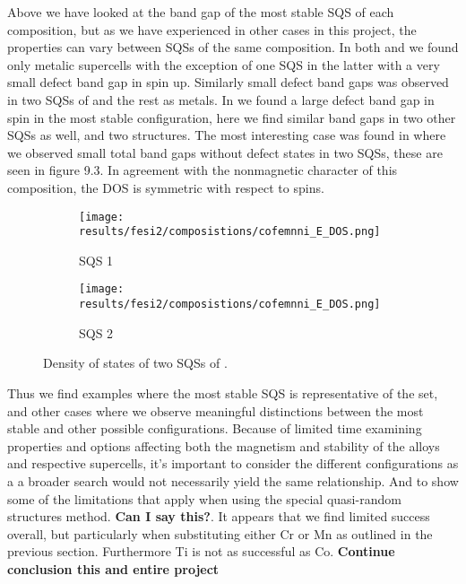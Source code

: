 Above we have looked at the band gap of the most stable SQS of each composition, but as we have experienced in other cases in this project, the properties can vary between SQSs of the same composition. In both  and  we found only metalic supercells with the exception of one SQS in the latter with a very small defect band gap in spin up. Similarly small defect band gaps was observed in two SQSs of  and the rest as metals. In  we found a large defect band gap in spin in the most stable configuration, here we find similar band gaps in two other SQSs as well, and two structures. The most interesting case was found in  where we observed small total band gaps without defect states in two SQSs, these are seen in figure 9.3. In agreement with the nonmagnetic character of this composition, the DOS is symmetric with respect to spins. 

\begin{figure}[H]
\begin{subfigure}{.5\textwidth}
\texttt{[image: results/fesi2/composistions/cofemnni\_E\_DOS.png]}
\caption{SQS 1}
\end{subfigure}
\begin{subfigure}{.5\textwidth}
\texttt{[image: results/fesi2/composistions/cofemnni\_E\_DOS.png]}
\caption{SQS 2}
\end{subfigure}
\caption{Density of states of two SQSs of .}
\end{figure} 

Thus we find examples where the most stable SQS is representative of the set, and other cases where we observe meaningful distinctions between the most stable and other possible configurations. Because of limited time examining properties and options affecting both the magnetism and stability of the alloys and respective supercells, it's important to consider the different configurations as a a broader search would not necessarily yield the same relationship. And to show some of the limitations that apply when using the special quasi-random structures method. \textbf{Can I say this?}. It appears that we find limited success overall, but particularly when substituting either Cr or Mn as outlined in the previous section. Furthermore Ti is not as successful as Co. \textbf{Continue conclusion this and entire project}
